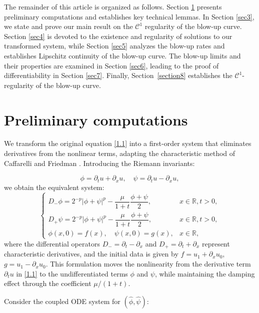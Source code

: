 \documentclass[
  sn-mathphys-num,
  colorlinks,
  linkcolor=darkmagenta,
  citecolor=rufous,
  urlcolor=zaffre,
  hypertexnames=false
]{sn-jnl}
\numberwithin{equation}{section}
\begin{document}
The remainder of this article is organized as follows. Section \ref{sec2} presents preliminary computations and establishes key technical lemmas. In Section \ref{sec3}, we state and prove our main result on the $\mathcal{C}^1$ regularity of the blow-up curve. Section \ref{sec4} is devoted to the existence and regularity of solutions to our transformed system, while Section \ref{sec5} analyzes the blow-up rates and establishes Lipschitz continuity of the blow-up curve. The blow-up limits and their properties are examined in Section \ref{sec6}, leading to the proof of differentiability in Section \ref{sec7}. Finally, Section~\ref{section8} establishes the $\mathcal{C}^1$-regularity of the blow-up curve.

\section{Preliminary computations}\label{sec2}
 We transform the original equation \eqref{1.1} into a first-order system that eliminates derivatives from the nonlinear terms, adapting the characteristic method of Caffarelli and Friedman \cite{Caffarelli1985,Caffarelli1986}. Introducing the Riemann invariants:

\begin{equation}
\phi = \partial_t u + \partial_x u, \quad \psi = \partial_t u - \partial_x u,
\end{equation}
we obtain the equivalent system:
\begin{equation}
\label{1.5}
\begin{cases}
D_- \phi = 2^{-p}|\phi + \psi|^p - \dfrac{\mu}{1 + t} \dfrac{\phi + \psi}{2}, & x \in \mathbb{R}, t > 0, \\
D_+ \psi = 2^{-p}|\phi + \psi|^p - \dfrac{\mu}{1 + t} \dfrac{\phi + \psi}{2}, & x \in \mathbb{R}, t > 0, \\
\phi(x, 0) = f(x), \quad \psi(x, 0) = g(x), & x \in \mathbb{R},
\end{cases}
\end{equation}
where the differential operators $D_- = \partial_t - \partial_x$ and $D_+ = \partial_t + \partial_x$ represent characteristic derivatives, and the initial data is given by $f = u_1 + \partial_x u_0$, $g = u_1 - \partial_x u_0$. This formulation moves the nonlinearity from the derivative term $\partial_t u$ in \eqref{1.1} to the undifferentiated terms $\phi$ and $\psi$, while maintaining the damping effect through the coefficient $\mu/(1+t)$.


Consider the coupled ODE system for $(\hat{\phi}, \hat{\psi})$:
\end{document}
